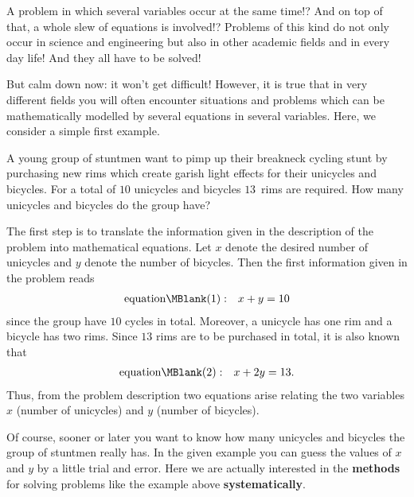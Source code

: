 \begin{MIntro}


A problem in which several variables occur at the same time!? And on top of that, 
a whole slew of equations is involved!? Problems of this kind do not only occur in science and 
engineering but also in other academic fields and in every day life! And they all have to be solved!

But calm down now: it won't get difficult! However, it is true that in very different fields  
you will often encounter situations and problems which can be mathematically modelled by
several equations in several variables. Here, we consider a simple first example.

\begin{MExample}
A young group of stuntmen want to pimp up their breakneck cycling stunt by purchasing new rims which create 
garish light effects for their unicycles and bicycles. For a total of $10$ unicycles and bicycles
$13$~rims are required. How many unicycles and bicycles do the group have? 

The first step is to translate the information given in the description of the problem into mathematical equations. Let $x$ denote the desired number of unicycles and $y$ denote the number of 
bicycles. Then the first information given in the problem reads
\begin{eqnarray*}
\mbox{equation}\MBlank (1) & : & x + y = 10
\end{eqnarray*}
since the group have $10$ cycles in total. Moreover, a unicycle has one rim and a bicycle has 
two rims. Since $13$ rims are to be purchased in total, it is also known that
\begin{eqnarray*}
\mbox{equation}\MBlank (2) & : & x + 2 y = 13.
\end{eqnarray*}
Thus, from the problem description two equations arise relating the two variables 
$x$ (number of unicycles) and $y$ (number of bicycles).
\end{MExample}

Of course, sooner or later you want to know how many unicycles and bicycles the group 
of stuntmen really has. In the given example you can guess the values of $x$ and $y$ by
a little trial and error. Here we are actually interested in the \textbf{methods}
for solving problems like the example above \textbf{systematically}.
\end{MIntro}

